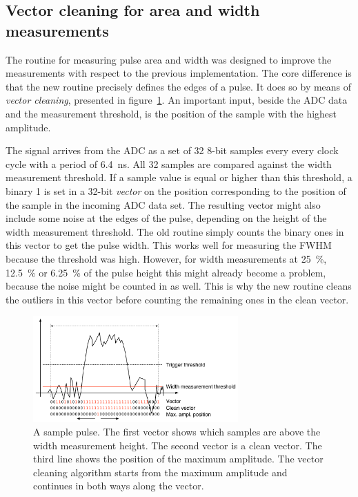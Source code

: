 \documentclass[12pt]{packages/mytustyle}  %
\begin{document}
\subsection{Vector cleaning for area and width measurements}
\label{sec:vecclean}
The routine for measuring pulse area and width was designed to improve the measurements with respect to the previous implementation. The core difference is that the new routine precisely defines the edges of a pulse. It does so by means of \emph{vector cleaning}, presented in figure~\ref{fig:samplepulse}. An important input, beside the ADC data and the measurement threshold, is the position of the sample with the highest amplitude. 

The signal arrives from the ADC as a set of 32 8-bit samples every every clock cycle with a period of 6.4~ns. All 32 samples are compared against the width measurement threshold. If a sample value is equal or higher than this threshold, a binary 1 is set in a 32-bit \emph{vector} on the position corresponding to the position of the sample in the incoming ADC data set. The resulting vector might also include some noise at the edges of the pulse, depending on the height of the width measurement threshold. The old routine simply counts the binary ones in this vector to get the pulse width. This works well for measuring the FWHM because the threshold was high. However, for width measurements at 25~\%, 12.5~\% or 6.25~\% of the pulse height this might already become a problem, because the noise might be counted in as well. This is why the new routine cleans the outliers in this vector before counting the remaining ones in the clean vector. 

\begin{figure}[!ht]
\centering
\includegraphics[width=0.7\textwidth]{plots/pulse1}
\caption{A sample pulse. The first vector shows which samples are above the width measurement height. The second vector is a clean vector. The third line shows the position of the maximum amplitude. The vector cleaning algorithm starts from the maximum amplitude and continues in both ways along the vector.}
\label{fig:samplepulse}
\end{figure}
\end{document}
